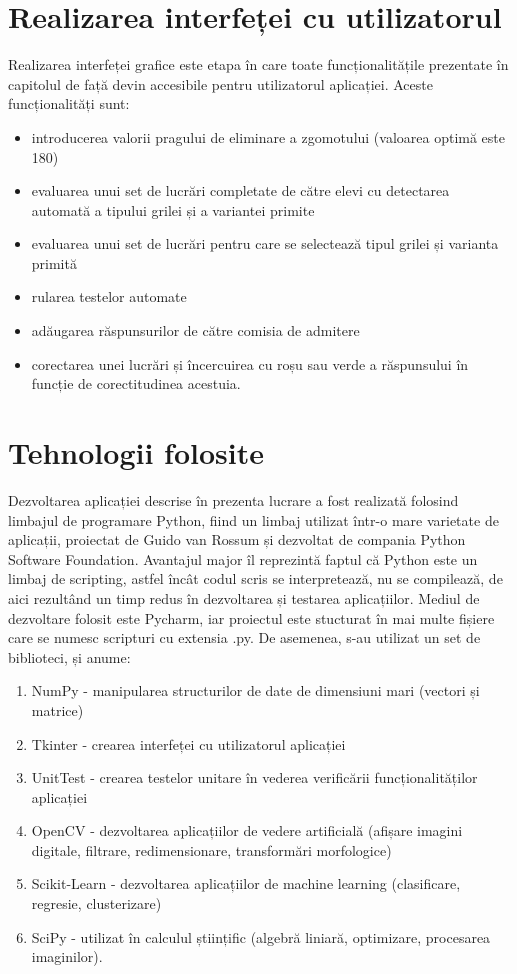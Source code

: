 \documentclass[a4paper,12pt]{report}
\newcommand\tab[1][1cm]{\hspace*{#1}}
\begin{document}
\section{Realizarea interfeței cu utilizatorul}
\tab Realizarea interfeței grafice este etapa în care toate funcționalitățile prezentate în capitolul de față devin accesibile pentru utilizatorul aplicației. Aceste funcționalități sunt:
\begin{itemize}
\setlength\itemsep{1pt}
\item introducerea valorii pragului de eliminare a zgomotului (valoarea optimă este 180)
\item evaluarea unui set de lucrări completate de către elevi cu detectarea automată a tipului grilei și a variantei primite 
\item evaluarea unui set de lucrări pentru care se selectează tipul grilei și varianta primită
\item rularea testelor automate
\item adăugarea răspunsurilor de către comisia de admitere
\item corectarea unei lucrări și încercuirea cu roșu sau verde a răspunsului în funcție de corectitudinea acestuia.
\end{itemize}
\section{Tehnologii folosite}
\tab Dezvoltarea aplicației descrise în prezenta lucrare a fost realizată folosind limbajul de programare Python, fiind un limbaj utilizat într-o mare varietate de aplicații, proiectat de Guido van
Rossum și dezvoltat de compania Python Software Foundation. Avantajul major îl reprezintă faptul că Python este un limbaj de scripting, astfel încât codul scris se interpretează, nu se compilează, de aici rezultând un timp redus în 
dezvoltarea și testarea aplicațiilor. Mediul de dezvoltare folosit este Pycharm, iar proiectul este stucturat în mai multe fișiere care se numesc scripturi cu extensia .py. De asemenea, s-au utilizat un set de biblioteci, și anume:
\begin{enumerate}
\setlength\itemsep{1pt}
\item NumPy - manipularea structurilor de date de dimensiuni mari (vectori și matrice)
\item Tkinter - crearea interfeței cu utilizatorul aplicației
\item UnitTest - crearea testelor unitare în vederea verificării funcționalităților aplicației
\item OpenCV - dezvoltarea aplicațiilor de vedere artificială (afișare imagini digitale, filtrare, redimensionare, transformări morfologice)
\item Scikit-Learn - dezvoltarea aplicațiilor de machine learning (clasificare, regresie, clusterizare)
\item SciPy - utilizat în calculul științific (algebră liniară, optimizare, procesarea imaginilor).
\end{enumerate}
\end{document}
